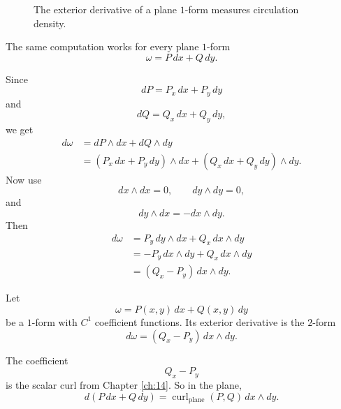 \begin{figure}[h]
\centering
{}
\caption{The exterior derivative of a plane \(1\)-form measures circulation density.}
\end{figure}

The same computation works for every plane \(1\)-form
\[
    \omega=P\,dx+Q\,dy.
\]

Since
\[
    dP=P_x\,dx+P_y\,dy
\]
and
\[
    dQ=Q_x\,dx+Q_y\,dy,
\]
we get
\[
\begin{aligned}
    d\omega
    &=
    dP\wedge dx+dQ\wedge dy\\
    &=
    (P_x\,dx+P_y\,dy)\wedge dx
    +
    (Q_x\,dx+Q_y\,dy)\wedge dy.
\end{aligned}
\]
Now use
\[
    dx\wedge dx=0,
    \qquad
    dy\wedge dy=0,
\]
and
\[
    dy\wedge dx=-dx\wedge dy.
\]
Then
\[
\begin{aligned}
    d\omega
    &=
    P_y\,dy\wedge dx+Q_x\,dx\wedge dy\\
    &=
    -P_y\,dx\wedge dy+Q_x\,dx\wedge dy\\
    &=
    (Q_x-P_y)\,dx\wedge dy.
\end{aligned}
\]

\begin{definition}
Let
\[
    \omega=P(x,y)\,dx+Q(x,y)\,dy
\]
be a \(1\)-form with \(C^1\) coefficient functions.  Its exterior derivative is the
\(2\)-form
\[
\boxed{
    d\omega=(Q_x-P_y)\,dx\wedge dy.
}
\]
\end{definition}

The coefficient
\[
    Q_x-P_y
\]
is the scalar curl from Chapter \ref{ch:14}.  So in the plane,
\[
\boxed{
    d(P\,dx+Q\,dy)
    =
    \operatorname{curl}_{\mathrm{plane}}(P,Q)\,dx\wedge dy.
}
\]

